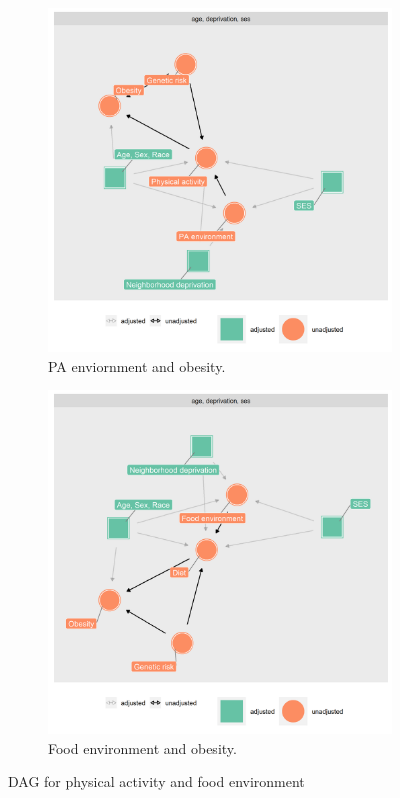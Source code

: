 \documentclass[12]{article}
\begin{document}
\newpage
\begin{figure}[h!]
  \centering
  \begin{subfigure}[b]{0.4\linewidth}
    \includegraphics[width=\linewidth]{graph/dag2.png}
    \caption{PA enviornment and obesity.}
  \end{subfigure}
  \begin{subfigure}[b]{0.4\linewidth}
    \includegraphics[width=\linewidth]{graph/dag3.png}
    \caption{Food environment and obesity.}
  \end{subfigure}
  \caption{DAG for physical activity and food environment}
  \label{fig:flight}
\end{figure}      
\end{document}
